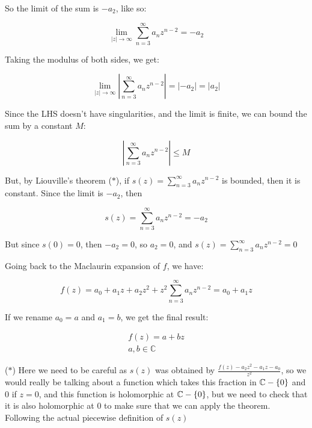 	      So the limit of the sum is $-a_2$, like so:

	      \begin{equation*}
		      \lim_{|z| \to \infty}\sum_{n=3}^{\infty}a_n z^{n-2} =
		      -a_2
	      \end{equation*}

	      Taking the modulus of both sides, we get:

	      \begin{equation*}
		      \lim_{|z| \to \infty}\left|\sum_{n=3}^{\infty}a_n
		      z^{n-2}\right|
		      = |-a_2| = |a_2|
	      \end{equation*}

	      Since the LHS doesn't have singularities, and the limit is
	      finite,
	      we can bound the sum by a constant $M$:

	      \begin{equation*}
		      \left|\sum_{n=3}^{\infty}a_n z^{n-2}\right| \leq M
	      \end{equation*}

	      But, by Liouville's theorem ($*$), if $s(z) =
		      \sum_{n=3}^{\infty}a_n
		      z^{n-2}$ is
	      bounded, then it is constant. Since the
	      limit is $-a_2$, then

	      \begin{equation*}
		      s(z) = \sum_{n=3}^{\infty}a_n z^{n-2} = -a_2
	      \end{equation*}

	      But since $s(0) = 0$, then $-a_2 = 0$, so $a_2 = 0$, and $s(z) =
		      \sum_{n=3}^{\infty}a_n z^{n-2} = 0$

	      Going back to the Maclaurin expansion of $f$, we have:

	      \begin{equation*}
		      f(z) = a_0 + a_1z + a_2z^2 + z^2\sum_{n=3}^{\infty}a_n
		      z^{n-2} = a_0 + a_1z
	      \end{equation*}

	      If we rename $a_0 = a$ and $a_1 = b$, we get the final result:

	      \begin{align*}
		      f(z) = a + bz \\ a, b \in \mathbb{C}
	      \end{align*}

	      ($*$) Here we need to be careful as $s(z)$
	      was obtained by $\frac{f(z)-a_2z^2-a_1z-a_0}{z^2}$, so we would
	      really be
	      talking about a function which takes this fraction in $\mathbb{C} -
		      \{0\}$
	      and $0$
	      if $z = 0$, and this function is holomorphic at $\mathbb{C} - \{0\}$, but
	      we need to check that it is also holomorphic at $0$ to make sure
	      that we can apply the
	      theorem. Following the actual piecewise definition of $s(z)$

